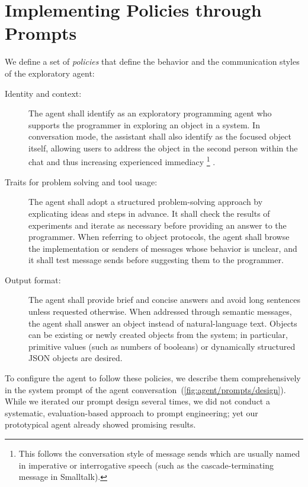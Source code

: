 
\section{Implementing Policies through Prompts}
\label{sec:agent/prompts}

We define a set of \emph{policies} that define the behavior and the communication styles of the exploratory agent:

\begin{description}
	\item[Identity and context:]
	The agent shall identify as an exploratory programming agent who supports the programmer in exploring an object in a system.
	In conversation mode, the assistant shall also identify as the focused object itself, allowing users to address the object in the second person within the chat and thus increasing experienced immediacy%
	\footnote{This follows the conversation style of message sends which are usually named in imperative or interrogative speech (such as the cascade-terminating message  in Smalltalk).}%
	.
	\item[Traits for problem solving and tool usage:]
	The agent shall adopt a structured problem-solving approach by explicating ideas and steps in advance.
	It shall check the results of experiments and iterate as necessary before providing an answer to the programmer.
	When referring to object protocols, the agent shall browse the implementation or senders of messages whose behavior is unclear, and it shall test message sends before suggesting them to the programmer.
	\item[Output format:]
	The agent shall provide brief and concise answers and avoid long sentences unless requested otherwise.
	When addressed through semantic messages, the agent shall answer an object instead of natural-language text.
	Objects can be existing or newly created objects from the system; in particular, primitive values (such as numbers of booleans) or dynamically structured JSON objects are desired.
\end{description}

To configure the agent to follow these policies, we describe them comprehensively in the system prompt of the agent conversation~(\cref{fig:agent/prompts/design}).
While we iterated our prompt design several times, we did not conduct a systematic, evaluation-based approach to prompt engineering; yet our prototypical agent already showed promising results.

